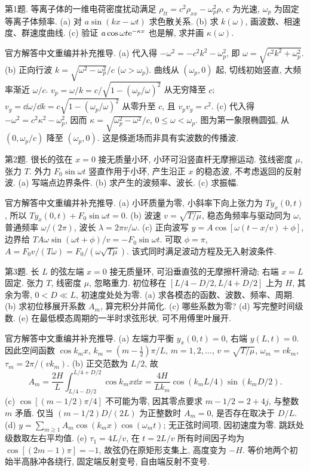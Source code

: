 \begin{exercise}\label{exam:e2.1}
第1题. 等离子体的一维电荷密度扰动满足 $\rho_{tt}=c^2\rho_{xx}-\omega_p^2\rho$, $c$ 为光速, $\omega_p$ 为固定等离子体频率. (a) 对 $a\sin(kx-\omega t)$ 求色散关系. (b) 求 $k(\omega)$, 画波数、相速度、群速度曲线. (c) 验证 $a\cos\omega t\mathrm e^{-\kappa x}$ 也是解, 求并画 $\kappa(\omega)$.
\end{exercise}
\begin{solution}
官方解答中文重编并补充推导. (a) 代入得 $-\omega^2=-c^2k^2-\omega_p^2$, 即 $\omega=\sqrt{c^2k^2+\omega_p^2}$.
(b) 正向行波 $k=\sqrt{\omega^2-\omega_p^2}/c$ ($\omega>\omega_p$). 曲线从 $(\omega_p,0)$ 起, 切线初始竖直, 大频率渐近 $\omega/c$. $v_p=\omega/k=c/\sqrt{1-(\omega_p/\omega)^2}$ 从无穷降至 $c$; $v_g=\dd\omega/\dd k=c\sqrt{1-(\omega_p/\omega)^2}$ 从零升至 $c$, 且 $v_pv_g=c^2$.
(c) 代入得 $-\omega^2=c^2\kappa^2-\omega_p^2$, 因而 $\kappa=\sqrt{\omega_p^2-\omega^2}/c$, $0\le\omega<\omega_p$. 图为第一象限椭圆弧, 从 $(0,\omega_p/c)$ 降至 $(\omega_p,0)$. 这是倏逝场而非具有实波数的传播波.
\end{solution}
\begin{exercise}\label{exam:e2.2}
第2题. 很长的弦在 $x=0$ 接无质量小环, 小环可沿竖直杆无摩擦运动. 弦线密度 $\mu$, 张力 $T$. 外力 $F_0\sin\omega t$ 竖直作用于小环, 产生沿正 $x$ 的稳态波, 不考虑返回的反射波. (a) 写端点边界条件. (b) 求产生的波频率、波长. (c) 求振幅.
\end{exercise}
\begin{solution}
官方解答中文重编并补充推导. (a) 小环质量为零, 小斜率下向上张力为 $Ty_x(0,t)$, 所以 $Ty_x(0,t)+F_0\sin\omega t=0$.
(b) 波速 $v=\sqrt{T/\mu}$, 稳态角频率与驱动同为 $\omega$, 普通频率 $\omega/(2\pi)$, 波长 $\lambda=2\pi v/\omega$.
(c) 正向波写 $y=A\cos[\omega(t-x/v)+\phi]$, 边界给 $TA\omega\sin(\omega t+\phi)/v=-F_0\sin\omega t$. 可取 $\phi=\pi$, $A=F_0v/(T\omega)=F_0/(\omega\sqrt{T\mu})$. 该式同时满足波动方程及无入射波条件.
\end{solution}
\begin{exercise}\label{exam:e2.3}
第3题. 长 $L$ 的弦左端 $x=0$ 接无质量环, 可沿垂直弦的无摩擦杆滑动; 右端 $x=L$ 固定. 张力 $T$, 线密度 $\mu$, 忽略重力. 初位移在 $[L/4-D/2,L/4+D/2]$ 上为 $H$, 其余为零, $0<D\ll L$, 初速度处处为零. (a) 求各模态的函数、波数、频率、周期. (b) 求初位移展开系数 $A_m$, 算完积分并简化. (c) 哪些系数为零? (d) 写完整时间级数. (e) 在最低模态周期的一半时求弦形状, 可不用傅里叶展开.
\end{exercise}
\begin{solution}
官方解答中文重编并补充推导. (a) 左端力平衡 $y_x(0,t)=0$, 右端 $y(L,t)=0$. 因此空间函数 $\cos k_mx$, $k_m=(m-\tfrac12)\pi/L$, $m=1,2,\ldots$, $v=\sqrt{T/\mu}$, $\omega_m=vk_m$, $\tau_m=2\pi/(vk_m)$.
(b) 正交范数为 $L/2$, 故
\[
A_m=\frac{2H}{L}\int_{L/4-D/2}^{L/4+D/2}\cos k_mx\dd x
=\frac{4H}{Lk_m}\cos(k_mL/4)\sin(k_mD/2).
\]
(c) $\cos[(m-1/2)\pi/4]$ 不可能为零, 因其零点要求 $m-1/2=2+4j$, 与整数 $m$ 矛盾. 仅当 $(m-1/2)D/(2L)$ 为正整数时 $A_m=0$, 是否存在取决于 $D/L$.
(d) $y=\sum_{m\ge1}A_m\cos(k_mx)\cos(\omega_mt)$; 无正弦时间项, 因初速度为零. 跳跃处级数取左右平均值.
(e) $\tau_1=4L/v$, 在 $t=2L/v$ 所有时间因子均为 $\cos[(2m-1)\pi]=-1$, 故弦仍在原矩形支集上, 高度变为 $-H$. 等价地两个初始半高脉冲各绕行, 固定端反射变号, 自由端反射不变号.
\end{solution}
